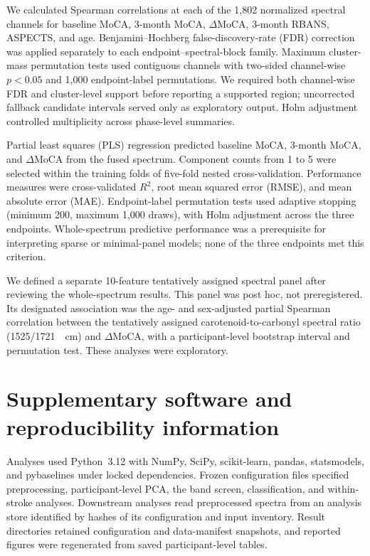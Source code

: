 \documentclass[preprint,12pt]{elsarticle}
\begin{document}
We calculated Spearman correlations at each of the 1,802 normalized spectral channels for baseline MoCA, 3-month MoCA, $\Delta$MoCA, 3-month RBANS, ASPECTS, and age. Benjamini--Hochberg false-discovery-rate (FDR) correction was applied separately to each endpoint--spectral-block family. Maximum cluster-mass permutation tests used contiguous channels with two-sided channel-wise $p<0.05$ and 1,000 endpoint-label permutations. We required both channel-wise FDR and cluster-level support before reporting a supported region; uncorrected fallback candidate intervals served only as exploratory output. Holm adjustment controlled multiplicity across phase-level summaries.

Partial least squares (PLS) regression predicted baseline MoCA, 3-month MoCA, and $\Delta$MoCA from the fused spectrum. Component counts from 1 to 5 were selected within the training folds of five-fold nested cross-validation. Performance measures were cross-validated $R^2$, root mean squared error (RMSE), and mean absolute error (MAE). Endpoint-label permutation tests used adaptive stopping (minimum 200, maximum 1,000 draws), with Holm adjustment across the three endpoints. Whole-spectrum predictive performance was a prerequisite for interpreting sparse or minimal-panel models; none of the three endpoints met this criterion.

We defined a separate 10-feature tentatively assigned spectral panel after reviewing the whole-spectrum results. This panel was post hoc, not preregistered. Its designated association was the age- and sex-adjusted partial Spearman correlation between the tentatively assigned carotenoid-to-carbonyl spectral ratio (1525/1721~\si{\per\centi\metre}) and $\Delta$MoCA, with a participant-level bootstrap interval and permutation test. These analyses were exploratory.


\section{Supplementary software and reproducibility information}
Analyses used Python~3.12 with NumPy, SciPy, scikit-learn, pandas, statsmodels, and pybaselines under locked dependencies. Frozen configuration files specified preprocessing, participant-level PCA, the band screen, classification, and within-stroke analyses. Downstream analyses read preprocessed spectra from an analysis store identified by hashes of its configuration and input inventory. Result directories retained configuration and data-manifest snapshots, and reported figures were regenerated from saved participant-level tables.
\end{document}

